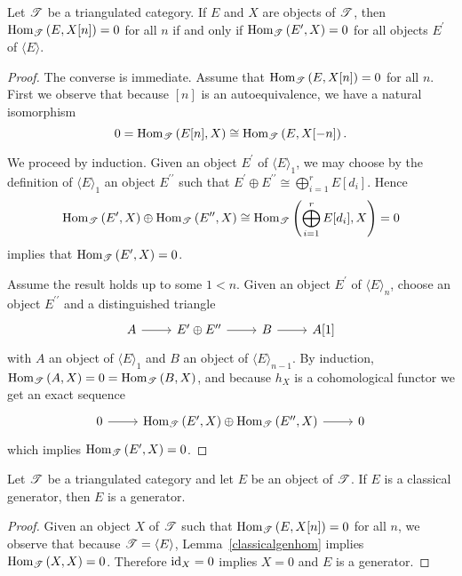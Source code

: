 \documentclass[dissertation.tex]{subfiles}
\begin{document}
\begin{lem}\label{classicalgenhom}
  Let $\mathscr{T}$ be a triangulated category.
  If $E$ and $X$ are objects of $\mathscr{T}$, then $\operatorname{Hom}_{\mathscr{T}}\left(E,X[n]\right) = 0$ for all $n$ if and only if $\operatorname{Hom}_{\mathscr{T}}\left(E^\prime, X\right) = 0$ for all objects $E^\prime$ of $\langle E \rangle$.
  
  \begin{proof}
    The converse is immediate.
    Assume that $\operatorname{Hom}_{\mathscr{T}}\left(E,X[n]\right) = 0$ for all $n$.
    First we observe that because $[n]$ is an autoequivalence, we have a natural isomorphism
    $$0 = \operatorname{Hom}_{\mathscr{T}}\left(E[n], X\right) \cong \operatorname{Hom}_{\mathscr{T}}\left(E, X[-n]\right).$$
    
    We proceed by induction.
    Given an object $E^\prime$ of $\langle E \rangle_1$, we may choose by the definition of $\langle E \rangle_1$ an object  $E^{\prime\prime}$ such that $E^\prime \oplus E^{\prime\prime} \cong \bigoplus_{i = 1}^r E[d_i]$.
    Hence
    $$\operatorname{Hom}_{\mathscr{T}}\left(E^\prime,X\right) \oplus \operatorname{Hom}_{\mathscr{T}}\left(E^{\prime\prime}, X\right) \cong \operatorname{Hom}_{\mathscr{T}}\left(\bigoplus_{i=1}^rE[d_i], X\right) = 0$$
    implies that $\operatorname{Hom}_{\mathscr{T}}\left(E^\prime, X\right) = 0$.
    
    Assume the result holds up to some $1 < n$.
    Given an object $E^\prime$ of $\langle E \rangle_n$, choose an object $E^{\prime\prime}$ and a distinguished triangle
    $$\begin{tikzcd}
      A \arrow{r} & E^\prime \oplus E^{\prime\prime} \arrow{r} & B \arrow{r} & A[1]
    \end{tikzcd}$$
    with $A$ an object of $\langle E \rangle_1$ and $B$ an object of $\langle E \rangle_{n-1}$.
    By induction, $\operatorname{Hom}_{\mathscr{T}}\left(A,X\right) = 0 = \operatorname{Hom}_{\mathscr{T}}\left(B,X\right)$, and because $h_X$ is a cohomological functor we get an exact sequence
    $$\begin{tikzcd}
      0 \arrow{r} & \Hom{\T}{E^\prime,X} \oplus \Hom{\T}{E^{\prime\prime}, X} \arrow{r} & 0
    \end{tikzcd}$$
    which implies $\operatorname{Hom}_{\mathscr{T}}\left(E^\prime,X\right) = 0$.
  \end{proof}
\end{lem}

\begin{lem}\label{classicalgenisgen}
  Let $\mathscr{T}$ be a triangulated category and let $E$ be an object of $\mathscr{T}$.
  If $E$ is a classical generator, then $E$ is a generator.
  
  \begin{proof}
    Given an object $X$ of $\mathscr{T}$ such that $\operatorname{Hom}_{\mathscr{T}}\left(E,X[n]\right) = 0$ for all $n$, we observe that because $\mathscr{T} = \langle E \rangle$, Lemma~\ref{classicalgenhom} implies $\operatorname{Hom}_{\mathscr{T}}\left(X,X\right) = 0$.
    Therefore $\operatorname{id}_{X} = 0$ implies $X = 0$ and $E$ is a generator.
  \end{proof}
\end{lem}
\end{document}

